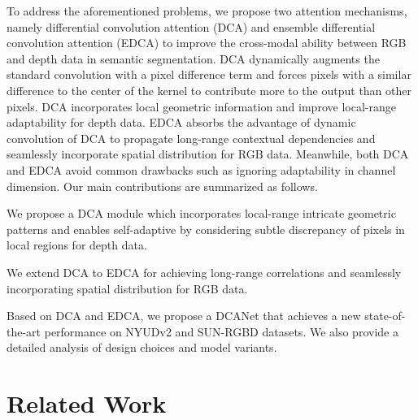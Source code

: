 \documentclass[10pt,twocolumn,letterpaper]{article}
\begin{document}
To address the aforementioned problems, we propose two attention mechanisms, namely differential convolution
attention (DCA) and ensemble differential convolution attention (EDCA) to improve the cross-modal ability between RGB and
depth data in semantic segmentation. DCA dynamically augments the standard convolution with a pixel difference term and forces pixels
with a similar difference to the center of the kernel to contribute more to the output than other pixels. DCA incorporates local
geometric information and improve local-range adaptability for depth data.
EDCA absorbs the advantage of dynamic convolution of DCA to propagate long-range contextual dependencies and seamlessly
incorporate spatial distribution for RGB data.
Meanwhile, both DCA and EDCA avoid common drawbacks such as ignoring adaptability in channel dimension. Our main contributions are summarized as follows.

 We propose a DCA module which incorporates local-range intricate geometric patterns and enables self-adaptive by considering
subtle discrepancy of pixels in local regions for depth data.


 We extend DCA to EDCA for achieving long-range correlations and seamlessly incorporating spatial distribution for RGB data.


 Based on DCA and EDCA, we propose a DCANet that achieves a new state-of-the-art performance on NYUDv2\cite{silberman2012indoor}
and SUN-RGBD\cite{song2015sun} datasets. We also provide a detailed analysis of design choices and model variants.



\section{Related Work}
\end{document}
